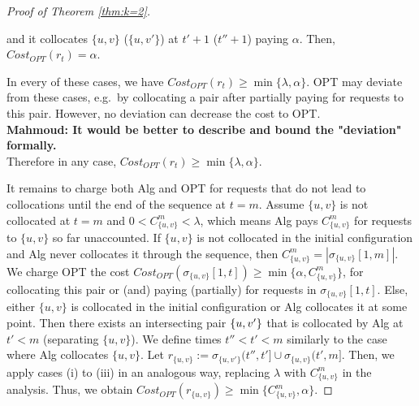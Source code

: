 \documentclass[manuscript,screen=true, review, anonymous]{acmart}
\DeclarePairedDelimiter\set{\{}{\}}
\newcommand\mahmoud[1]{\color{orange}\textbf{\\ Mahmoud: #1}\\\color{black}}
\begin{document}
\begin{proof}[Proof of Theorem \ref{thm:k=2}]
\begin{enumerate}[label=\roman*.]
		and it collocates $\{u,v\}$ ($\{u,v'\}$) at $t'+1$ ($t''+1$) paying $\alpha$.
		Then,
		$\mathit{Cost}_{\mathit{OPT}} (r_t) = \alpha$.
	\end{enumerate}
	In every of these cases,
	we have
	$\mathit{Cost}_{\mathit{OPT}} (r_t) \geq  \min{ \{ \lambda, \alpha \}}$.
	OPT may deviate from these cases,
	e.g.~by collocating a pair after partially paying for requests to this pair.
	However,
	no deviation can decrease the cost to OPT.
	\mahmoud{It would be better to describe and bound the "deviation" formally.}
	Therefore in any case,
	$\mathit{Cost}_{\mathit{OPT}} (r_t) \geq  \min{ \{ \lambda, \alpha \}}$.
	
	It remains to charge both Alg and OPT for requests that do not lead to collocations until the  end of the sequence at $t=m$.
	Assume $\{u,v\}$ is not collocated at $t=m$
	and $0 < C^{m}_{ \{u,v\} } < \lambda $,
	which means Alg pays $C^{m}_{ \{u,v\} }$
	for requests to $\{u,v\}$ so far unaccounted.
	If $\{u,v\}$ is not collocated in the initial configuration
	and Alg never collocates it through the sequence,
	then $ C^{m}_{ \{u,v\} } =| \sigma_{\{u,v\}}[1,m] |$.
	We charge OPT the cost
	$\mathit{Cost}_{\mathit{OPT}} (\sigma_{\{u,v\}}[1,t]) 
	\geq \min{ \{ \alpha, C^{m}_{ \{u,v\} } \} }$,
	for collocating this pair or (and) paying (partially) for requests in $\sigma_{\{u,v\}}[1,t]$.
	Else,
	either $\{u,v\}$ is collocated in the initial configuration
	or Alg collocates it at some point.
	Then there exists an intersecting pair $\set{u,v'}$
	that is collocated by Alg at $t' < m$ (separating $\{u,v\}$).
	We define times $t'' < t' < m$ similarly to the case where Alg collocates $\{u,v\}$.
	Let $r_{\{u,v\}} := \sigma_{\{u,v'\}} (t'',t'] \cup \sigma_{\{u,v\}} (t',m]$.
	Then,
	we apply cases (i) to (iii) in an analogous way,
	replacing $\lambda$ with $C^{m}_{ \{u,v\}}$ in the analysis.
	Thus, 
	we obtain
	$\mathit{Cost}_{\mathit{OPT}} (r_{\{u,v\}}) 
	\geq  \min{ \{ C^{m}_{ \{u,v\}}, \alpha \}}$.
	

\end{proof}
\end{document}

